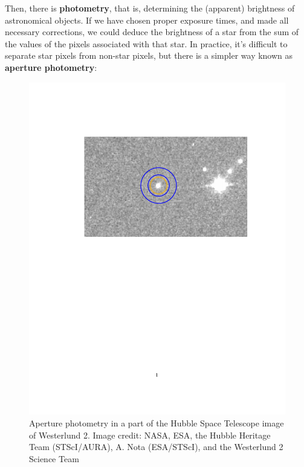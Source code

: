 \documentclass[twocolumn,apj]{openjournal}
\begin{document}
Then, there is {\bf photometry}, that is, determining the (apparent) brightness of astronomical objects. If we have chosen proper exposure times, and made all necessary corrections, we could deduce the brightness of a star from the sum of the values of the pixels associated with that star. In practice, it's difficult to separate star pixels from non-star pixels, but there is a simpler way known as {\bf aperture photometry}: 
\begin{figure}[htbp]
\begin{center}
\includegraphics[width=\linewidth]{aperture-photometry.pdf}
\caption{Aperture photometry in a part of the Hubble Space Telescope image of Westerlund 2. Image credit: NASA, ESA, the Hubble Heritage Team (STScI/AURA), A. Nota (ESA/STScI), and the Westerlund 2 Science Team}
\label{ApPhot}
\end{center}
\end{figure}
\end{document}
